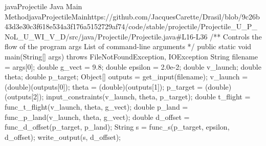 \begin{codeSnippet}{java}{Projectile Java Main Method}{javaProjectileMain}{https://github.com/JacquesCarette/Drasil/blob/9c26b43d3e30c3f618e534a3f176a5152729af74/code/stable/projectile/Projectile_U_P_NoL_U_WI_V_D/src/java/Projectile/Projectile.java\#L16-L36}
/** \brief Controls the flow of the program
    \param args List of command-line arguments
*/
public static void main(String[] args) throws FileNotFoundException, IOException {
    String filename = args[0];
    double g_vect = 9.8;
    double epsilon = 2.0e-2;
    double v_launch;
    double theta;
    double p_target;
    Object[] outputs = get_input(filename);
    v_launch = (double)(outputs[0]);
    theta = (double)(outputs[1]);
    p_target = (double)(outputs[2]);
    input_constraints(v_launch, theta, p_target);
    double t_flight = func_t_flight(v_launch, theta, g_vect);
    double p_land = func_p_land(v_launch, theta, g_vect);
    double d_offset = func_d_offset(p_target, p_land);
    String s = func_s(p_target, epsilon, d_offset);
    write_output(s, d_offset);
}
\end{codeSnippet}
